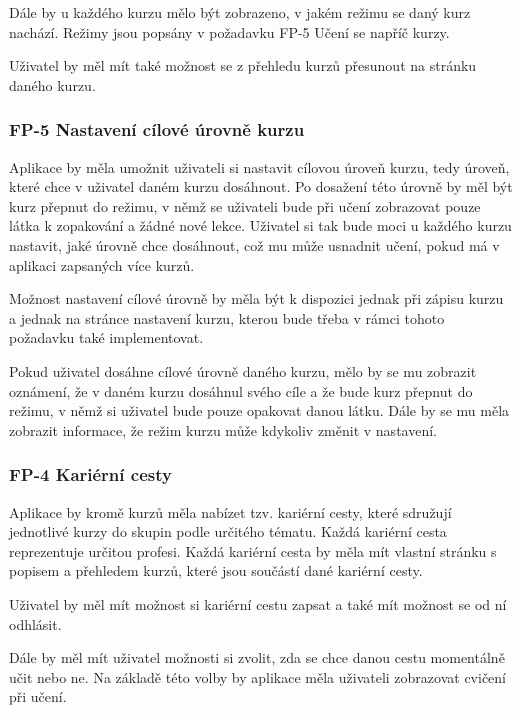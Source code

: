 Dále by u každého kurzu mělo být zobrazeno, v jakém režimu se daný kurz nachází. Režimy jsou popsány v požadavku FP-5 Učení se napříč kurzy. %

Uživatel by měl mít také možnost se z přehledu kurzů přesunout na stránku daného kurzu.

\subsubsection{FP-5 Nastavení cílové úrovně kurzu}

Aplikace by měla umožnit uživateli si nastavit cílovou úroveň kurzu, tedy úroveň, které chce v uživatel daném kurzu dosáhnout. Po dosažení této úrovně by měl být kurz přepnut do režimu, v němž se uživateli bude při učení zobrazovat pouze látka k zopakování a žádné nové lekce. Uživatel si tak bude moci u každého kurzu nastavit, jaké úrovně chce dosáhnout, což mu může usnadnit učení, pokud má v aplikaci zapsaných více kurzů.

Možnost nastavení cílové úrovně by měla být k dispozici jednak při zápisu kurzu a jednak na stránce nastavení kurzu, kterou bude třeba v rámci tohoto požadavku také implementovat.

Pokud uživatel dosáhne cílové úrovně daného kurzu, mělo by se mu zobrazit oznámení, že v daném kurzu dosáhnul svého cíle a že bude kurz přepnut do režimu, v němž si uživatel bude pouze opakovat danou látku. Dále by se mu měla zobrazit informace, že režim kurzu může kdykoliv změnit v nastavení.

\subsubsection{FP-4 Kariérní cesty}

Aplikace by kromě kurzů měla nabízet tzv. kariérní cesty, které sdružují jednotlivé kurzy do skupin podle určitého tématu. Každá kariérní cesta reprezentuje určitou profesi. Každá kariérní cesta by měla mít vlastní stránku s popisem a přehledem kurzů, které jsou součástí dané kariérní cesty.

Uživatel by měl mít možnost si kariérní cestu zapsat a také mít možnost se od ní odhlásit.

Dále by měl mít uživatel možnosti si zvolit, zda se chce danou cestu momentálně učit nebo ne. Na základě této volby by aplikace měla uživateli zobrazovat cvičení při učení.

